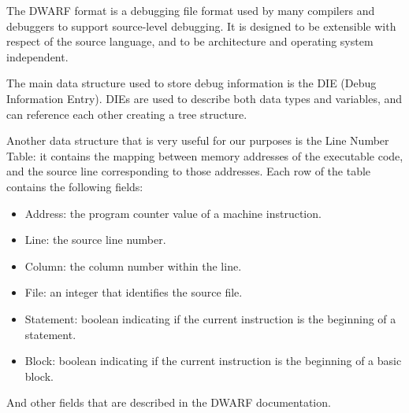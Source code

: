 The DWARF format \cite{dwarf} is a debugging file format used by many compilers and debuggers to support source-level debugging. It is designed to be extensible with respect of the source language, and to be architecture and operating system independent. \par
The main data structure used to store debug information is the DIE (Debug Information Entry). DIEs are used to describe both data types and variables, and can reference each other creating a tree structure. \par
Another data structure that is very useful for our purposes is the Line Number Table: it contains the mapping between memory addresses of the executable code, and the source line corresponding to those addresses.\newline
Each row of the table contains the following fields:
\begin{itemize}
\item Address: the program counter value of a machine instruction.
\item Line: the source line number.
\item Column: the column number within the line.
\item File: an integer that identifies the source file.
\item Statement: boolean indicating if the current instruction is the beginning of a statement.
\item Block: boolean indicating if the current instruction is the beginning of a basic block.
\end{itemize}
And other fields that are described in the DWARF documentation.


